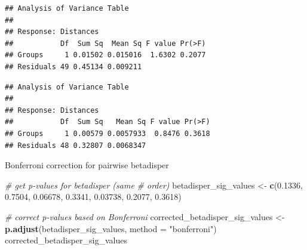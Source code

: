 \documentclass[]{article}
\newenvironment{Shaded}{\begin{snugshade}}{\end{snugshade}}
\newcommand{\KeywordTok}[1]{\textcolor[rgb]{0.13,0.29,0.53}{\textbf{#1}}}
\newcommand{\DataTypeTok}[1]{\textcolor[rgb]{0.13,0.29,0.53}{#1}}
\newcommand{\FloatTok}[1]{\textcolor[rgb]{0.00,0.00,0.81}{#1}}
\newcommand{\StringTok}[1]{\textcolor[rgb]{0.31,0.60,0.02}{#1}}
\newcommand{\CommentTok}[1]{\textcolor[rgb]{0.56,0.35,0.01}{\textit{#1}}}
\newcommand{\OperatorTok}[1]{\textcolor[rgb]{0.81,0.36,0.00}{\textbf{#1}}}
\newcommand{\NormalTok}[1]{#1}
\begin{document}
\begin{verbatim}
## Analysis of Variance Table
## 
## Response: Distances
##           Df  Sum Sq  Mean Sq F value Pr(>F)
## Groups     1 0.01502 0.015016  1.6302 0.2077
## Residuals 49 0.45134 0.009211
\end{verbatim}

\begin{Shaded}
\end{Shaded}

\begin{verbatim}
## Analysis of Variance Table
## 
## Response: Distances
##           Df  Sum Sq   Mean Sq F value Pr(>F)
## Groups     1 0.00579 0.0057933  0.8476 0.3618
## Residuals 48 0.32807 0.0068347
\end{verbatim}

Bonferroni correction for pairwise betadisper

\begin{Shaded}
\begin{Highlighting}[]
\CommentTok{# get p-values for betadisper (same}
\CommentTok{# order)}
\NormalTok{betadisper_sig_values <-}\StringTok{ }\KeywordTok{c}\NormalTok{(}\FloatTok{0.1336}\NormalTok{, }\FloatTok{0.7504}\NormalTok{, }
    \FloatTok{0.06678}\NormalTok{, }\FloatTok{0.3341}\NormalTok{, }\FloatTok{0.03738}\NormalTok{, }\FloatTok{0.2077}\NormalTok{, }\FloatTok{0.3618}\NormalTok{)}

\CommentTok{# correct p-values based on Bonferroni}
\NormalTok{corrected_betadisper_sig_values <-}\StringTok{ }\KeywordTok{p.adjust}\NormalTok{(betadisper_sig_values, }
    \DataTypeTok{method =} \StringTok{"bonferroni"}\NormalTok{)}
\NormalTok{corrected_betadisper_sig_values}
\end{Highlighting}
\end{Shaded}
\end{document}
